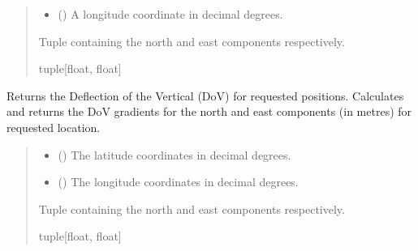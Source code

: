 \documentclass[letterpaper,10pt,english]{sphinxmanual}
\begin{document}
\begin{fulllineitems}
\begin{fulllineitems}
\begin{quote}
\begin{description}
\begin{itemize}
\item {} 
\sphinxAtStartPar
{} () \textendash{} A longitude coordinate in decimal degrees.

\end{itemize}

\sphinxAtStartPar
Tuple containing the north and east components respectively.

\sphinxAtStartPar
tuple{[}float, float{]}

\end{description}\end{quote}

\end{fulllineitems}


\begin{fulllineitems}
\label{\detokenize{modules/earth/geoid:qnav.earth.geoid.GeoidDummy.get_dov_vec}}
\pysigstartsignatures
{}
\pysigstopsignatures
\sphinxAtStartPar
Returns the Deflection of the Vertical (DoV) for requested positions.
Calculates and returns the DoV gradients for the north and east
components (in metres) for requested location.
\begin{quote}\begin{description}
\begin{itemize}
\item {} 
\sphinxAtStartPar
{} () \textendash{} The latitude coordinates in decimal degrees.

\item {} 
\sphinxAtStartPar
{} () \textendash{} The longitude coordinates in decimal degrees.

\end{itemize}

\sphinxAtStartPar
Tuple containing the north and east components respectively.

\sphinxAtStartPar
tuple{[}float, float{]}

\end{description}\end{quote}

\end{fulllineitems}


\end{fulllineitems}
\end{document}
